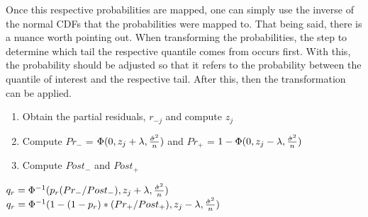 
Once this respective probabilities are mapped, one can simply use the inverse of the normal CDFs that the probabilities were mapped to. That being said, there is a nuance worth pointing out. When transforming the probabilities, the step to determine which tail the respective quantile comes from occurs first. With this, the probability should be adjusted so that it refers to the probability between the quantile of interest and the respective tail. After this, then the transformation can be applied.

\begin{enumerate}
	\item Obtain the partial residuals, $r_{-j}$ and compute $z_j$
	\item Compute $Pr_{-}$ = $\Phi(0, z_j + \lambda, \frac{\hat{\sigma}^2}{n})$ and $Pr_{+}$ = $1 - \Phi(0, z_j - \lambda, \frac{\hat{\sigma}^2}{n})$
	\item Compute $Post_-$ and $Post_+$
\end{enumerate}
\begin{algorithmic}
    \State $q_r = \Phi^{-1}(p_r(Pr_{-} / Post_{-}), z_j + \lambda, \frac{\hat{\sigma}^2}{n})$
  \Else
      \State $q_r = \Phi^{-1}(1 - (1 - p_r)*(Pr_{+} / Post_{+}), z_j - \lambda, \frac{\hat{\sigma}^2}{n})$
  \EndIf
\end{algorithmic}
  

